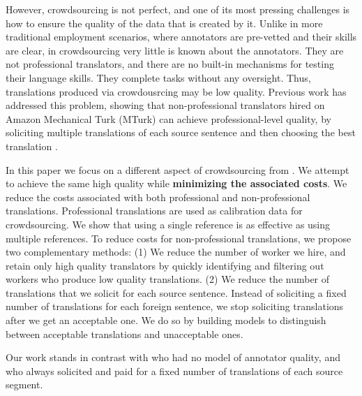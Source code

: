 \documentclass[11pt,letterpaper]{article}
\begin{document}
However, crowdsourcing is not perfect, and one of its most pressing challenges is how to ensure the quality of the data that is created by it.  Unlike in more traditional employment scenarios, where annotators are pre-vetted and their skills are clear, in crowdsourcing very little is known about the annotators.  They are not professional translators, and there are no built-in mechanisms for testing their language skills.  They complete tasks without any oversight. Thus, translations produced via crowdousrcing may be low quality.
Previous work has addressed this problem, showing that non-professional translators hired on Amazon Mechanical Turk (MTurk) can achieve professional-level quality, by soliciting multiple translations of each source sentence and then choosing the best translation \cite{zaidan-callisonburch:2011:ACL-HLT2011a}.

In this paper we focus on a different aspect of crowdsourcing from .  We attempt to achieve the same high quality while {\bf minimizing the associated costs}.  
We reduce the costs associated with both professional and non-professional translations. Professional translations are used as calibration data for crowdsourcing. We show that using a single reference is as effective as using multiple references.
To  reduce costs for non-professional translations, we propose two complementary methods: (1) We reduce the number of worker we hire, and retain only high quality translators by quickly identifying and filtering out workers who produce low quality translations. 
(2) We reduce the number of translations that we solicit for each source sentence. Instead of soliciting a fixed number of translations for each foreign sentence, we stop soliciting translations after we get an acceptable one.  We do so by building models to distinguish between acceptable translations and unacceptable ones.  

Our work stands in contrast with   who had no model of annotator quality, and who always solicited and paid for a fixed number of translations of each source segment. 
 
\end{document}
